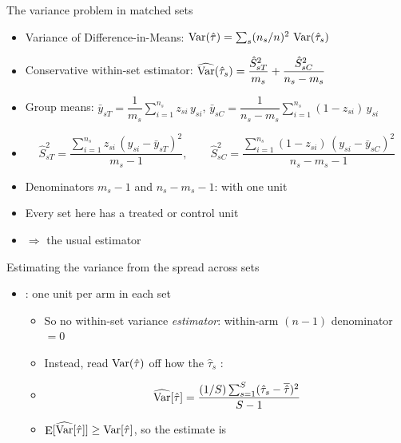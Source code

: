 \documentclass[table, xcolor = {dvipsnames}, 9pt]{beamer}
\theoremstyle{plain}
\newcommand{\mh}[1]{{\color{magenta}{#1}}}
\DeclareMathOperator{\E}{\rm{E}}
\DeclareMathOperator{\Var}{\rm{Var}}
\begin{document}
\begin{frame}[t]{The variance problem in matched sets}
\vfill
\begin{itemize} \vfill
\item Variance of Difference-in-Means: $\Var(\hat{\tau}) = \sum_s (n_s/n)^2\, \Var(\hat{\tau}_s)$ \vfill 
\item Conservative within-set estimator:  $\widehat{\Var}(\hat{\tau}_s) = \dfrac{\hat{S}^2_{sT}}{m_s} + \dfrac{\hat{S}^2_{sC}}{n_s - m_s}$ \vfill
\item[] Group means: $\bar{y}_{sT} = \dfrac{1}{m_s}\displaystyle\sum_{i=1}^{n_s} z_{si}\, y_{si}$, \quad $\bar{y}_{sC} = \dfrac{1}{n_s - m_s}\displaystyle\sum_{i=1}^{n_s} (1 - z_{si})\, y_{si}$ \vfill
\item[]
\begin{equation*}
\hat{S}^2_{sT} = \frac{\sum_{i=1}^{n_s} z_{si}\,(y_{si} - \bar{y}_{sT})^2}{m_s - 1},
\qquad
\hat{S}^2_{sC} = \frac{\sum_{i=1}^{n_s} (1 - z_{si})\,(y_{si} - \bar{y}_{sC})^2}{n_s - m_s - 1}
\end{equation*} \vfill
\item Denominators $m_s - 1$ and $n_s - m_s - 1$: \mh{undefined} with one unit \vfill
\item Every set here has a \mh{single} treated or control unit \vfill
\item[] $\Rightarrow$ the usual estimator \mh{fails} \vfill
\end{itemize} \vfill
\end{frame}
\begin{frame}[t]{Estimating the variance from the spread across sets}
\vfill
\begin{itemize} \vfill
\item \mh{Matched pairs}: one unit per arm in each set \vfill 
\begin{itemize} \vfill
\item So no within-set variance \emph{estimator}: within-arm $(n - 1)$ denominator $= 0$  \vfill
\item Instead, read $\Var(\hat{\tau})$ off how the $\hat{\tau}_s$ \mh{vary across sets}:
\item[]
\begin{align*}
\widehat{\Var}[\hat{\tau}] = \dfrac{(1/S) \sum_{s = 1}^S (\hat{\tau}_s - \overline{\hat{\tau}})^2}{S - 1}
\end{align*} 
\vfill 
\item $\E[\widehat{\Var}[\hat{\tau}]] \geq \Var[\hat{\tau}]$, so the estimate is \mh{conservative}
\end{itemize} \vfill 
\end{itemize} \vfill
\end{frame}
\end{document}
